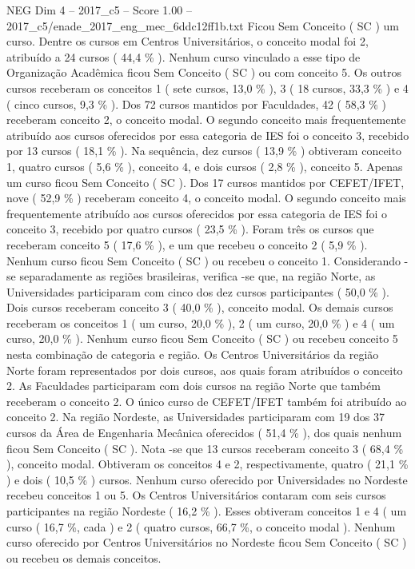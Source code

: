 \begin{textsample}{NEG Dim 4 – 2017\_c5 – Score 1.00 – 2017\_c5/enade\_2017\_eng\_mec\_6ddc12ff1b.txt}
Ficou Sem Conceito ( SC ) um curso.
Dentre os cursos em Centros Universitários, o conceito modal foi 2, atribuído a 24 cursos ( 44,4 \% ).
Nenhum curso vinculado a esse tipo de Organização Acadêmica ficou Sem Conceito ( SC ) ou com conceito 5.
Os outros cursos receberam os conceitos 1 ( sete cursos, 13,0 \% ), 3 ( 18 cursos, 33,3 \% ) e 4 ( cinco cursos, 9,3 \% ).
Dos 72 cursos mantidos por Faculdades, 42 ( 58,3 \% ) receberam conceito 2, o conceito modal.
O segundo conceito mais frequentemente atribuído aos cursos oferecidos por essa categoria de IES foi o conceito 3, recebido por 13 cursos ( 18,1 \% ).
Na sequência, dez cursos ( 13,9 \% ) obtiveram conceito 1, quatro cursos ( 5,6 \% ), conceito 4, e dois cursos ( 2,8 \% ), conceito 5.
Apenas um curso ficou Sem Conceito ( SC ).
Dos 17 cursos mantidos por CEFET/IFET, nove ( 52,9 \% ) receberam conceito 4, o conceito modal.
O segundo conceito mais frequentemente atribuído aos cursos oferecidos por essa categoria de IES foi o conceito 3, recebido por quatro cursos ( 23,5 \% ).
Foram três os cursos que receberam conceito 5 ( 17,6 \% ), e um que recebeu o conceito 2 ( 5,9 \% ).
Nenhum curso ficou Sem Conceito ( SC ) ou recebeu o conceito 1.
Considerando -se separadamente as regiões brasileiras, verifica -se que, na região Norte, as Universidades participaram com cinco dos dez cursos participantes ( 50,0 \% ).
Dois cursos receberam conceito 3 ( 40,0 \% ), conceito modal.
Os demais cursos receberam os conceitos 1 ( um curso, 20,0 \% ), 2 ( um curso, 20,0 \% ) e 4 ( um curso, 20,0 \% ).
Nenhum curso ficou Sem Conceito ( SC ) ou recebeu conceito 5 nesta combinação de categoria e região.
Os Centros Universitários da região Norte foram representados por dois cursos, aos quais foram atribuídos o conceito 2.
As Faculdades participaram com dois cursos na região Norte que também receberam o conceito 2.
O único curso de CEFET/IFET também foi atribuído ao conceito 2.
Na região Nordeste, as Universidades participaram com 19 dos 37 cursos da Área de Engenharia Mecânica oferecidos ( 51,4 \% ), dos quais nenhum ficou Sem Conceito ( SC ).
Nota -se que 13 cursos receberam conceito 3 ( 68,4 \% ), conceito modal.
Obtiveram os conceitos 4 e 2, respectivamente, quatro ( 21,1 \% ) e dois ( 10,5 \% ) cursos.
Nenhum curso oferecido por Universidades no Nordeste recebeu conceitos 1 ou 5.
Os Centros Universitários contaram com seis cursos participantes na região Nordeste ( 16,2 \% ).
Esses obtiveram conceitos 1 e 4 ( um curso ( 16,7 \%, cada ) e 2 ( quatro cursos, 66,7 \%, o conceito modal ).
Nenhum curso oferecido por Centros Universitários no Nordeste ficou Sem Conceito ( SC ) ou recebeu os demais conceitos.

\end{textsample}
